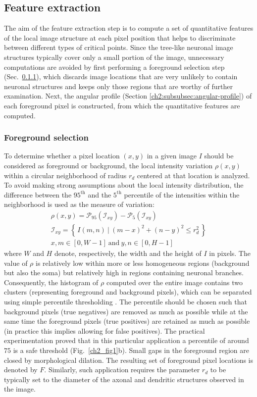 \subsection{Feature extraction}
\label{ch2:subsec:feature-extraction}
The aim of the feature extraction step is to compute a set of quantitative features of the local image structure at each pixel position that helps to discriminate between different types of critical points. Since the tree-like neuronal image structures typically cover only a small portion of the image, unnecessary computations are avoided by first performing a foreground selection step (Sec.~\ref{ch2:subsubsec:foreground-selection}), which discards image locations that are very unlikely to contain neuronal structures and keeps only those regions that are worthy of further examination. Next, the angular profile (Section \ref{ch2:subsubsec:angular-profile}) of each foreground pixel is constructed, from which the quantitative features are computed.

\subsubsection{Foreground selection}
\label{ch2:subsubsec:foreground-selection}
To determine whether a pixel location $(x,y)$ in a given image $I$ should be considered as foreground or background, the local intensity variation $\rho(x,y)$ within a circular neighborhood of radius $r_{d}$ centered at that location is analyzed. To avoid making strong assumptions about the local intensity distribution, the difference between the $95^\textrm{th}$ and the $5^\textrm{th}$ percentile of the intensities within the neighborhood is used as the measure of variation:
\begin{gather} 
\rho(x,y) = \mathcal{P}_{95}(\mathcal{I}_{xy}) - \mathcal{P}_{5}(\mathcal{I}_{xy}) \\
\mathcal{I}_{xy} = \left\{\, I(m,n)\ |\ (m-x)^{2}+(n-y)^{2} \leq r_d^2\, \right\} \\
x,m \in [0,W-1]\ \textrm{and}\ y,n \in [0,H-1]
\end{gather}
where $W$ and $H$ denote, respectively, the width and the height of $I$ in pixels. The value of $\rho$ is relatively low within more or less homogeneous regions (background but also the soma) but relatively high in regions containing neuronal branches. Consequently, the histogram of $\rho$ computed over the entire image contains two clusters (representing foreground and background pixels), which can be separated using simple percentile thresholding \cite{doyle1962operations}. The percentile should be chosen such that background pixels (true negatives) are removed as much as possible while at the same time the foreground pixels (true positives) are retained as much as possible (in practice this implies allowing for false positives). The practical experimentation proved that in this particular application a percentile of around $75$ is a safe threshold (Fig.~\ref{ch2_fig1}b). Small gaps in the foreground region are closed by morphological dilation. The resulting set of foreground pixel locations is denoted by $F$. Similarly, such application requires the parameter $r_{d}$ to be typically set to the diameter of the axonal and dendritic structures observed in the image.

